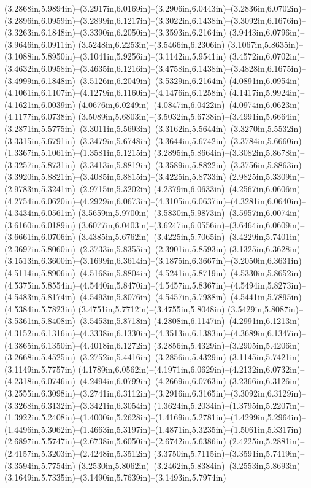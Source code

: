 (3.2868in,5.9894in)--(3.2917in,6.0169in)--(3.2906in,6.0443in)--(3.2836in,6.0702in)--(3.2896in,6.0959in)--(3.2899in,6.1217in)--(3.3022in,6.1438in)--(3.3092in,6.1676in)--(3.3263in,6.1848in)--(3.3390in,6.2050in)--(3.3593in,6.2164in) (3.9443in,6.0796in)--(3.9646in,6.0911in) (3.5248in,6.2253in)--(3.5466in,6.2306in) (3.1067in,5.8635in)--(3.1088in,5.8950in)--(3.1041in,5.9256in)--(3.1142in,5.9541in) (3.4572in,6.0702in)--(3.4632in,6.0958in)--(3.4635in,6.1216in)--(3.4758in,6.1438in)--(3.4828in,6.1675in)--(3.4999in,6.1848in)--(3.5126in,6.2049in)--(3.5329in,6.2164in) (4.0891in,6.0954in)--(4.1061in,6.1107in)--(4.1279in,6.1160in)--(4.1476in,6.1258in) (4.1417in,5.9924in)--(4.1621in,6.0039in) (4.0676in,6.0249in)--(4.0847in,6.0422in)--(4.0974in,6.0623in)--(4.1177in,6.0738in) (3.5089in,5.6803in)--(3.5032in,5.6738in)--(3.4991in,5.6664in) (3.2871in,5.5775in)--(3.3011in,5.5693in)--(3.3162in,5.5644in)--(3.3270in,5.5532in) (3.3315in,5.6791in)--(3.3479in,5.6748in)--(3.3644in,5.6742in)--(3.3784in,5.6660in) (1.3367in,5.1061in)--(1.3581in,5.1215in) (3.2895in,5.8664in)--(3.3082in,5.8678in)--(3.3257in,5.8731in)--(3.3413in,5.8819in)--(3.3589in,5.8822in)--(3.3756in,5.8863in)--(3.3920in,5.8821in)--(3.4085in,5.8815in)--(3.4225in,5.8733in) (2.9825in,5.3309in)--(2.9783in,5.3241in)--(2.9715in,5.3202in) (4.2379in,6.0633in)--(4.2567in,6.0606in)--(4.2754in,6.0620in)--(4.2929in,6.0673in)--(4.3105in,6.0637in)--(4.3281in,6.0640in)--(4.3434in,6.0561in) (3.5659in,5.9700in)--(3.5830in,5.9873in)--(3.5957in,6.0074in)--(3.6160in,6.0189in) (3.6077in,6.0403in)--(3.6247in,6.0556in)--(3.6464in,6.0609in)--(3.6661in,6.0706in) (3.4385in,5.6762in)--(3.4225in,5.7065in)--(3.4229in,5.7401in) (2.3697in,5.8060in)--(2.3733in,5.8355in)--(2.3901in,5.8593in) (3.1325in,6.3628in)--(3.1513in,6.3600in)--(3.1699in,6.3614in)--(3.1875in,6.3667in)--(3.2050in,6.3631in) (4.5114in,5.8906in)--(4.5168in,5.8804in)--(4.5241in,5.8719in)--(4.5330in,5.8652in)--(4.5375in,5.8554in)--(4.5440in,5.8470in)--(4.5457in,5.8367in)--(4.5494in,5.8273in)--(4.5483in,5.8174in)--(4.5493in,5.8076in)--(4.5457in,5.7988in)--(4.5441in,5.7895in)--(4.5384in,5.7823in) (3.4751in,5.7712in)--(3.4755in,5.8048in) (3.5429in,5.8087in)--(3.5361in,5.8408in)--(3.5453in,5.8718in) (4.2808in,6.1147in)--(4.2991in,6.1213in)--(4.3152in,6.1316in)--(4.3338in,6.1330in)--(4.3513in,6.1383in)--(4.3689in,6.1347in)--(4.3865in,6.1350in)--(4.4018in,6.1272in) (3.2856in,5.4329in)--(3.2905in,5.4206in) (3.2668in,5.4525in)--(3.2752in,5.4416in)--(3.2856in,5.4329in) (3.1145in,5.7421in)--(3.1149in,5.7757in) (4.1789in,6.0562in)--(4.1971in,6.0629in)--(4.2132in,6.0732in)--(4.2318in,6.0746in)--(4.2494in,6.0799in)--(4.2669in,6.0763in) (3.2366in,6.3126in)--(3.2555in,6.3098in)--(3.2741in,6.3112in)--(3.2916in,6.3165in)--(3.3092in,6.3129in)--(3.3268in,6.3132in)--(3.3421in,6.3054in) (1.3624in,5.2034in)--(1.3795in,5.2207in)--(1.3922in,5.2408in)--(1.4000in,5.2628in)--(1.4169in,5.2781in)--(1.4299in,5.2964in)--(1.4496in,5.3062in)--(1.4663in,5.3197in)--(1.4871in,5.3235in)--(1.5061in,5.3317in) (2.6897in,5.5747in)--(2.6738in,5.6050in)--(2.6742in,5.6386in) (2.4225in,5.2881in)--(2.4157in,5.3203in)--(2.4248in,5.3512in) (3.3750in,5.7115in)--(3.3591in,5.7419in)--(3.3594in,5.7754in) (3.2530in,5.8062in)--(3.2462in,5.8384in)--(3.2553in,5.8693in) (3.1649in,5.7335in)--(3.1490in,5.7639in)--(3.1493in,5.7974in) 